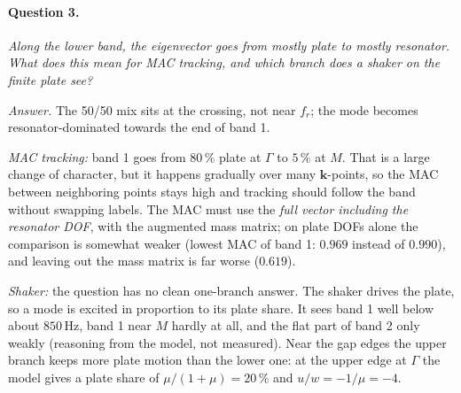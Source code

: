 \paragraph{Question 3.} \emph{Along the lower band, the eigenvector goes from
mostly plate to mostly resonator. What does this mean for MAC tracking, and
which branch does a shaker on the finite plate see?}

\emph{Answer.} The 50/50 mix sits at the crossing, not near $f_r$; the mode
becomes resonator-dominated towards the end of band 1.

\emph{MAC tracking:} band 1 goes from $80\,\%$ plate at $\Gamma$ to $5\,\%$ at
$M$. That is a large change of character, but it happens gradually over many
$\mathbf{k}$-points, so the MAC between neighboring points stays high and
tracking should follow the band without swapping labels. The MAC must use the
\emph{full vector including the resonator DOF}, with the augmented mass matrix;
on plate DOFs alone the comparison is somewhat weaker (lowest MAC of band 1:
$0.969$ instead of $0.990$), and leaving out the mass matrix is far worse ($0.619$).

\emph{Shaker:} the question has no clean one-branch answer. The shaker drives the
plate, so a mode is excited in proportion to its plate share. It sees band 1 well
below about $850\,\mathrm{Hz}$, band 1 near $M$ hardly at all, and the flat part
of band 2 only weakly (reasoning from the model, not measured). Near the gap
edges the upper branch keeps more plate motion than the lower one: at the upper
edge at $\Gamma$ the model gives a plate share of $\mu/(1+\mu) = 20\,\%$ and
$u/w = -1/\mu = -4$.
